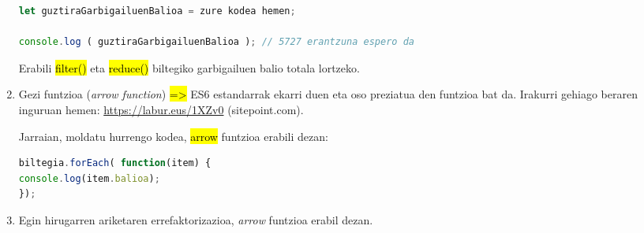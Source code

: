 \begin{enumerate}
\begin{lstlisting}[language=JavaScript, numbers=none]
let guztiraGarbigailuenBalioa = zure kodea hemen;

console.log ( guztiraGarbigailuenBalioa ); // 5727 erantzuna espero da
\end{lstlisting}

Erabili \hl{filter()} eta \hl{reduce()} biltegiko garbigailuen balio totala lortzeko. 

\item Gezi funtzioa (\textit{arrow function})  \hl{=>} ES6 estandarrak ekarri duen eta oso preziatua  den funtzioa  bat da. Irakurri gehiago beraren inguruan hemen:  \newline \href{https://www.sitepoint.com/es6-arrow-functions-new-fat-concise-syntax-javascript/}{https://labur.eus/1XZv0} (sitepoint.com).

Jarraian, moldatu hurrengo kodea, \hl{arrow} funtzioa erabili dezan:

\begin{lstlisting}[language=JavaScript, numbers=none]
biltegia.forEach( function(item) {
console.log(item.balioa);
});
\end{lstlisting}

\item Egin hirugarren ariketaren errefaktorizazioa, \textit{arrow} funtzioa erabil dezan.


\end{enumerate}

